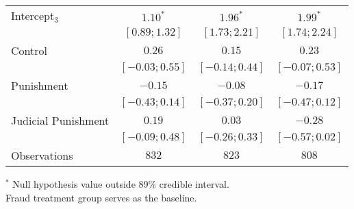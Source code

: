 \begin{table}[h]
\begin{center}
\begin{threeparttable}
\begin{tabular}{l c c c}
Intercept$_3$       & $1.10^{*}$        & $1.96^{*}$        & $1.99^{*}$        \\
                    & $ [ 0.89;  1.32]$ & $ [ 1.73;  2.21]$ & $ [ 1.74;  2.24]$ \\
Control             & $0.26$            & $0.15$            & $0.23$            \\
                    & $ [-0.03;  0.55]$ & $ [-0.14;  0.44]$ & $ [-0.07;  0.53]$ \\
Punishment          & $-0.15$           & $-0.08$           & $-0.17$           \\
                    & $ [-0.43;  0.14]$ & $ [-0.37;  0.20]$ & $ [-0.47;  0.12]$ \\
Judicial Punishment & $0.19$            & $0.03$            & $-0.28$           \\
                    & $ [-0.09;  0.48]$ & $ [-0.26;  0.33]$ & $ [-0.57;  0.02]$ \\
\hline
Observations        & $832$             & $823$             & $808$             \\
\hline
\end{tabular}
\begin{tablenotes}[flushleft]
\scriptsize{$^*$ Null hypothesis value outside 89\% credible interval.  \\
Fraud treatment group serves as the baseline.}
\end{tablenotes}
\end{threeparttable}
\label{table:coefficients}
\end{center}
\end{table}
